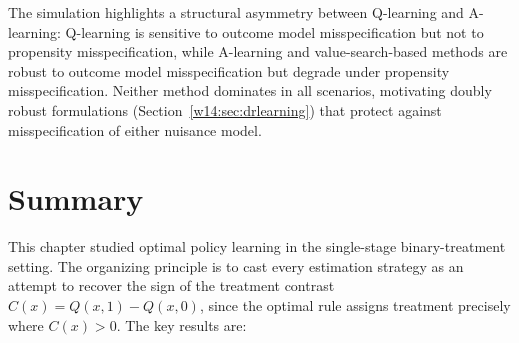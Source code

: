 \documentclass[master.tex]{subfiles}
\begin{document}
\begin{remark}
  The simulation highlights a structural asymmetry between Q-learning and
  A-learning: Q-learning is sensitive to outcome model misspecification but
  not to propensity misspecification, while A-learning and value-search-based
  methods are robust to outcome model misspecification but degrade under
  propensity misspecification. Neither method dominates in all scenarios,
  motivating doubly robust formulations (Section~\ref{w14:sec:drlearning})
  that protect against misspecification of either nuisance model.
\end{remark}

\section{Summary}
\label{w14:sec:summary}

This chapter studied optimal policy learning in the single-stage binary-treatment setting. The organizing principle is to cast every estimation strategy as an attempt to recover the sign of the treatment contrast $C(x)=Q(x,1)-Q(x,0)$, since the optimal rule assigns treatment precisely where $C(x)>0$. The key results are:
\end{document}
